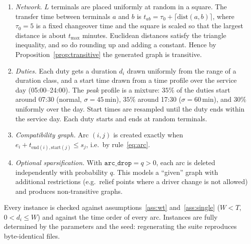 \begin{enumerate}[label=\arabic*.,nosep]
  \item \emph{Network.} $L$ terminals are placed uniformly at random in a
    square. The transfer time between terminals $a$ and $b$ is
    $t_{ab}=\tau_0+\lceil\mathrm{dist}(a,b)\rceil$, where $\tau_0=5$ is a
    fixed changeover time and the square is scaled so that the largest
    distance is about $t_{\max}$ minutes. Euclidean distances satisfy the
    triangle inequality, and so do rounding up and adding a constant. Hence
    by Proposition~\ref{prop:transitive} the generated graph is transitive.
  \item \emph{Duties.} Each duty gets a duration $d_i$ drawn uniformly from
    the range of a duration class, and a start time drawn from a time
    profile over the service day (05:00--24:00). The \emph{peak} profile is a
    mixture: $35\%$ of the duties start around 07:30 (normal,
    $\sigma=45$\,min), $35\%$ around 17:30 ($\sigma=60$\,min), and $30\%$
    uniformly over the day. Start times are resampled until the duty ends
    within the service day. Each duty starts and ends at random terminals.
  \item \emph{Compatibility graph.} Arc $(i,j)$ is created exactly when
    $e_i+t_{\text{end}(i),\text{start}(j)}\le s_j$, i.e.\ by
    rule~\eqref{eq:arc}.
  \item \emph{Optional sparsification.} With $\texttt{arc\_drop}=q>0$, each
    arc is deleted independently with probability $q$. This models a
    ``given'' graph with additional restrictions (e.g.\ relief points where
    a driver change is not allowed) and produces non-transitive graphs.
\end{enumerate}
Every instance is checked against assumptions~\ref{ass:wt}
and~\ref{ass:single} ($W<T$, $0<d_i\le W$) and against the time order of every
arc. Instances are fully determined by the parameters and the seed:
regenerating the suite reproduces byte-identical files.

